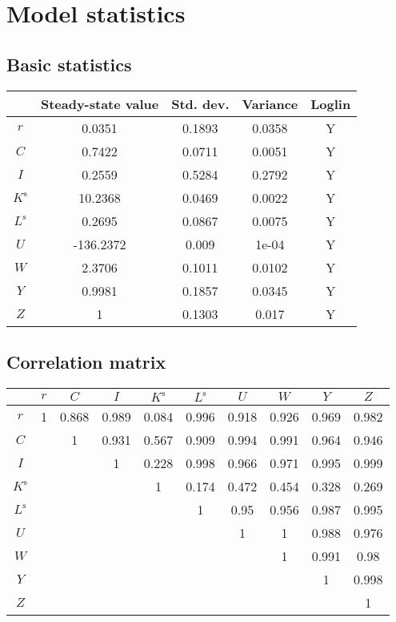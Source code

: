 

\section{Model statistics}

\subsection{Basic statistics}

\begin{tabular}{c|c|c|c|c|}
  & Steady-state value & Std. dev. & Variance & Loglin\\
\hline
$r$ & 0.0351 & 0.1893 & 0.0358 & Y    \\
$C$ & 0.7422 & 0.0711 & 0.0051 & Y    \\
$I$ & 0.2559 & 0.5284 & 0.2792 & Y    \\
$K^{\mathrm{s}}$ & 10.2368 & 0.0469 & 0.0022 & Y    \\
$L^{\mathrm{s}}$ & 0.2695 & 0.0867 & 0.0075 & Y    \\
$U$ & -136.2372 & 0.009 & 1e-04 & Y    \\
$W$ & 2.3706 & 0.1011 & 0.0102 & Y    \\
$Y$ & 0.9981 & 0.1857 & 0.0345 & Y    \\
$Z$ & 1 & 0.1303 & 0.017 & Y    \\
\hline
\end{tabular}


\subsection{Correlation matrix}

\begin{tabular}{c|ccccccccc|}
  & $r$ & $C$ & $I$ & $K^{\mathrm{s}}$ & $L^{\mathrm{s}}$ & $U$ & $W$ & $Y$ & $Z$\\
\hline
$r$ & 1 & 0.868 & 0.989 & 0.084 & 0.996 & 0.918 & 0.926 & 0.969 & 0.982 \\
$C$ &  & 1 & 0.931 & 0.567 & 0.909 & 0.994 & 0.991 & 0.964 & 0.946 \\
$I$ &  &  & 1 & 0.228 & 0.998 & 0.966 & 0.971 & 0.995 & 0.999 \\
$K^{\mathrm{s}}$ &  &  &  & 1 & 0.174 & 0.472 & 0.454 & 0.328 & 0.269 \\
$L^{\mathrm{s}}$ &  &  &  &  & 1 & 0.95 & 0.956 & 0.987 & 0.995 \\
$U$ &  &  &  &  &  & 1 & 1 & 0.988 & 0.976 \\
$W$ &  &  &  &  &  &  & 1 & 0.991 & 0.98 \\
$Y$ &  &  &  &  &  &  &  & 1 & 0.998 \\
$Z$ &  &  &  &  &  &  &  &  & 1 \\
\hline
\end{tabular}


